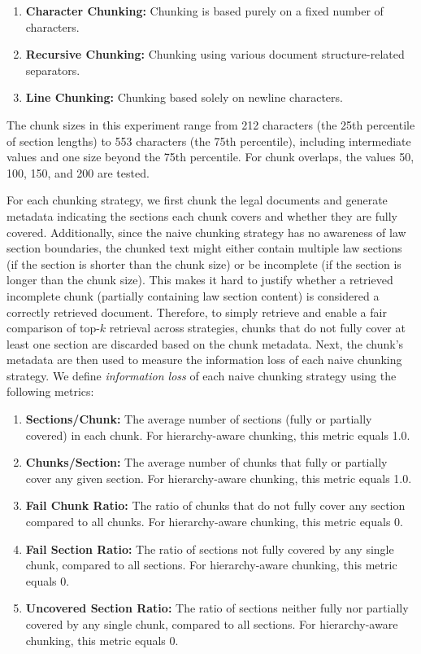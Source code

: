 \begin{enumerate}
    \item \textbf{Character Chunking: } Chunking is based purely on a fixed number of characters.
    \item \textbf{Recursive Chunking: } Chunking using various document structure-related separators.
    \item \textbf{Line Chunking: } Chunking based solely on newline characters.
\end{enumerate}

The chunk sizes in this experiment range from 212 characters (the 25th percentile of section lengths) to 553 characters (the 75th percentile), including intermediate values and one size beyond the 75th percentile. 
%
For chunk overlaps, the values 50, 100, 150, and 200 are tested. 

For each chunking strategy, we first chunk the legal documents and generate metadata indicating the sections each chunk covers and whether they are fully covered. 
%
Additionally, since the naive chunking strategy has no awareness of law section boundaries, the chunked text might either contain multiple law sections (if the section is shorter than the chunk size) or be incomplete (if the section is longer than the chunk size). 
%
This makes it hard to justify whether a retrieved incomplete chunk (partially containing law section content) is considered a correctly retrieved document. 
%
Therefore, to simply retrieve and enable a fair comparison of top-$k$ retrieval across strategies, chunks that do not fully cover at least one section are discarded based on the chunk metadata.
%
Next, the chunk's metadata are then used to measure the information loss of each naive chunking strategy.
%
We define \textit{information loss} of each naive chunking strategy using the following metrics:
%

\begin{enumerate}
    \item \textbf{Sections/Chunk: } The average number of sections (fully or partially covered) in each chunk. For hierarchy-aware chunking, this metric equals 1.0.
    \item \textbf{Chunks/Section: } The average number of chunks that fully or partially cover any given section. For hierarchy-aware chunking, this metric equals 1.0.
    \item \textbf{Fail Chunk Ratio: } The ratio of chunks that do not fully cover any section compared to all chunks. For hierarchy-aware chunking, this metric equals 0.
    \item \textbf{Fail Section Ratio: } The ratio of sections not fully covered by any single chunk, compared to all sections. For hierarchy-aware chunking, this metric equals 0.
    \item \textbf{Uncovered Section Ratio: } The ratio of sections neither fully nor partially covered by any single chunk, compared to all sections. For hierarchy-aware chunking, this metric equals 0.
\end{enumerate}

